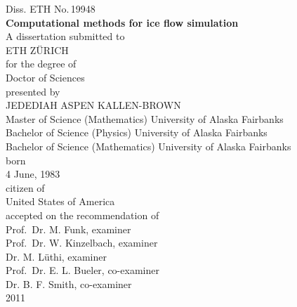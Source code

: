 \begin{titlepage}
  \begin{center}
    \large
    Diss. ETH No.\,19948\\
    \vspace{2.0cm} 
    \LARGE
    \textbf{
      Computational methods for ice flow simulation
    }
    \large
    \\    
    \vspace{1.5cm}
    A dissertation submitted to\\[0.5em]

    ETH Z\"URICH \\[2.0em]


    for the degree of \\[0.5em]

    Doctor of Sciences\\[3.0em]


    presented by \\[0.5em]

    JEDEDIAH ASPEN KALLEN-BROWN \\[0.5em]

    Master of Science (Mathematics) University of Alaska Fairbanks \\
    Bachelor of Science (Physics) University of Alaska Fairbanks \\
    Bachelor of Science (Mathematics) University of Alaska Fairbanks \\[2.0em]

    born\\[0.5em]
    4 June, 1983\\[2.0em]

    citizen of\\[0.5em]

    United States of America\\[3.0em]



    accepted on the recommendation of\\[1.0em]

    Prof.~Dr. M. Funk, examiner\\[0.5em]

    Prof.~Dr. W. Kinzelbach, examiner\\[0.5em]

    Dr. M. L\"uthi, examiner\\[0.5em]

    Prof.~Dr. E. L. Bueler, co-examiner\\[0.5em]

    Dr. B. F. Smith, co-examiner\\[5.0em]

    2011\\
  \end{center}
\end{titlepage}



